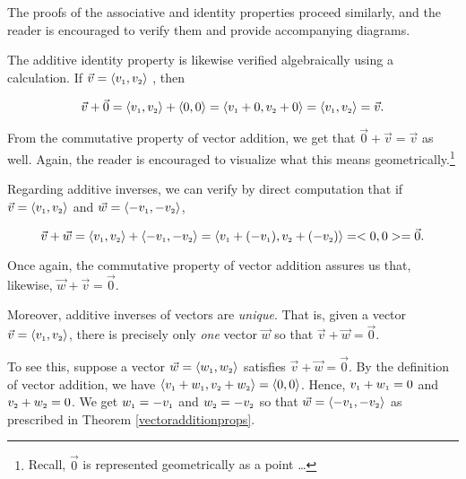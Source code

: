 The proofs of the associative and identity properties proceed similarly, and the reader is encouraged to verify them and provide accompanying diagrams.  

\smallskip

The additive identity property is likewise verified algebraically using a calculation.  If $\vec{v} = \left<v_{\mbox{\tiny $1$}},v_{\mbox{\tiny $2$}}\right>$ , then

 \[ \vec{v} + \vec{0} = \left<v_{\mbox{\tiny $1$}},v_{\mbox{\tiny $2$}}\right> + \left<0, 0\right> = \left< v_{\mbox{\tiny $1$}} + 0, v_{\mbox{\tiny $2$}} + 0 \right> =  \left<v_{\mbox{\tiny $1$}},v_{\mbox{\tiny $2$}}\right>  = \vec{v}.\]
 
 From the commutative property of vector addition, we get that $\vec{0} + \vec{v} = \vec{v}$ as well.  Again, the reader is encouraged to visualize what this means geometrically.\footnote{Recall, $\vec{0}$ is represented geometrically as a point \ldots}
 
\smallskip

Regarding additive inverses, we can verify by direct computation that if $\vec{v} = \left< v_{\mbox{\tiny $1$}}, v_{\mbox{\tiny $2$}} \right>$ and  $\vec{w} = \left< - v_{\mbox{\tiny $1$}}, -v_{\mbox{\tiny $2$}} \right>$, 

\[ \vec{v} + \vec{w} = \left< v_{\mbox{\tiny $1$}}, v_{\mbox{\tiny $2$}} \right> + \left< - v_{\mbox{\tiny $1$}}, -v_{\mbox{\tiny $2$}} \right> = \left<  v_{\mbox{\tiny $1$}} + ( - v_{\mbox{\tiny $1$}}), v_{\mbox{\tiny $2$}} + ( - v_{\mbox{\tiny $2$}}) \right> = <0,0> = \vec{0}.\]

Once again, the commutative property of vector addition assures us  that, likewise, $\vec{w} + \vec{v} = \vec{0}$.

\smallskip

Moreover, additive inverses of vectors are \textit{unique}.    That is, given a vector $\vec{v} = \left<v_{\mbox{\tiny $1$}}, v_{\mbox{\tiny $2$}}\right>$, there is precisely only \textit{one} vector $\vec{w}$ so that $\vec{v} + \vec{w} = \vec{0}$.

\smallskip

To see this, suppose a vector $\vec{w} = \left<w_{\mbox{\tiny $1$}},w_{\mbox{\tiny $2$}}\right>$ satisfies  $\vec{v} + \vec{w} = \vec{0}$.  By the definition of vector addition, we have $\left<v_{\mbox{\tiny $1$}} + w_{\mbox{\tiny $1$}}, v_{\mbox{\tiny $2$}} + w_{\mbox{\tiny $2$}}\right> = \left<0,0\right>$.  Hence, $v_{\mbox{\tiny $1$}} + w_{\mbox{\tiny $1$}} = 0$ and $v_{\mbox{\tiny $2$}} + w_{\mbox{\tiny $2$}} = 0$.  We get $w_{\mbox{\tiny $1$}} = -v_{\mbox{\tiny $1$}}$ and $w_{\mbox{\tiny $2$}}  = -v_{\mbox{\tiny $2$}} $ so that $\vec{w} = \left<-v_{\mbox{\tiny $1$}} , -v_{\mbox{\tiny $2$}} \right>$ as prescribed in Theorem \ref{vectoradditionprops}.  

